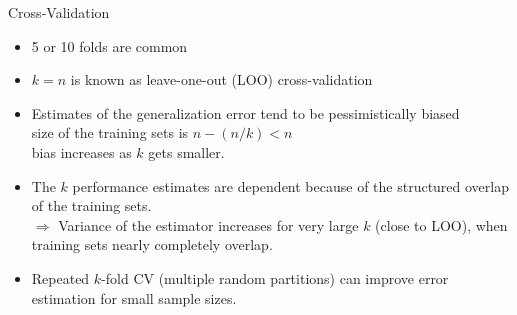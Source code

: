 \documentclass[11pt,compress,t,notes=noshow, xcolor=table]{beamer}
\begin{document}
\begin{vbframe}{Cross-Validation}

\begin{itemize}
  \item 5 or 10 folds are common%
  \item $k = n$ is known as leave-one-out (LOO) cross-validation
  \item Estimates of the generalization error tend to be pessimistically biased\\
    size of the training sets is $ n- (n/k) < n$\\ 
    bias increases as $k$ gets smaller.
  \item The $k$ performance estimates are dependent because
  of the structured overlap of the training sets.\\
  $\Rightarrow$ Variance of the estimator increases for very large $k$ (close to LOO),
  when training sets nearly completely overlap.
  \item Repeated $k$-fold CV (multiple random partitions)
  can improve error estimation for small sample sizes.
\end{itemize}
\end{vbframe}
\end{document}
